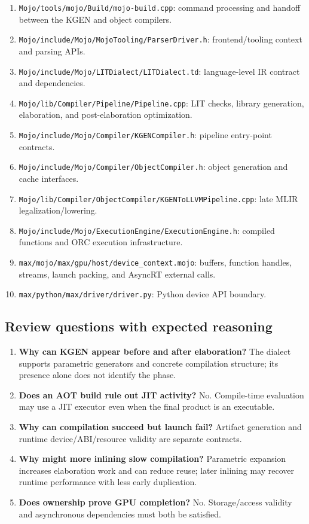 \documentclass[11pt,a4paper]{article}
\begin{document}
\begin{enumerate}
\item \nolinkurl{Mojo/tools/mojo/Build/mojo-build.cpp}: command processing and handoff between the KGEN and object compilers.
\item \nolinkurl{Mojo/include/Mojo/MojoTooling/ParserDriver.h}: frontend/tooling context and parsing APIs.
\item \nolinkurl{Mojo/include/Mojo/LITDialect/LITDialect.td}: language-level IR contract and dependencies.
\item \nolinkurl{Mojo/lib/Compiler/Pipeline/Pipeline.cpp}: LIT checks, library generation, elaboration, and post-elaboration optimization.
\item \nolinkurl{Mojo/include/Mojo/Compiler/KGENCompiler.h}: pipeline entry-point contracts.
\item \nolinkurl{Mojo/include/Mojo/Compiler/ObjectCompiler.h}: object generation and cache interfaces.
\item \nolinkurl{Mojo/lib/Compiler/ObjectCompiler/KGENToLLVMPipeline.cpp}: late MLIR legalization/lowering.
\item \nolinkurl{Mojo/include/Mojo/ExecutionEngine/ExecutionEngine.h}: compiled functions and ORC execution infrastructure.
\item \nolinkurl{max/mojo/max/gpu/host/device_context.mojo}: buffers, function handles, streams, launch packing, and AsyncRT external calls.
\item \nolinkurl{max/python/max/driver/driver.py}: Python device API boundary.
\end{enumerate}

\subsection{Review questions with expected reasoning}
\begin{enumerate}
\item \textbf{Why can KGEN appear before and after elaboration?} The dialect supports parametric generators and concrete compilation structure; its presence alone does not identify the phase.
\item \textbf{Does an AOT build rule out JIT activity?} No. Compile-time evaluation may use a JIT executor even when the final product is an executable.
\item \textbf{Why can compilation succeed but launch fail?} Artifact generation and runtime device/ABI/resource validity are separate contracts.
\item \textbf{Why might more inlining slow compilation?} Parametric expansion increases elaboration work and can reduce reuse; later inlining may recover runtime performance with less early duplication.
\item \textbf{Does ownership prove GPU completion?} No. Storage/access validity and asynchronous dependencies must both be satisfied.
\end{enumerate}
\end{document}
